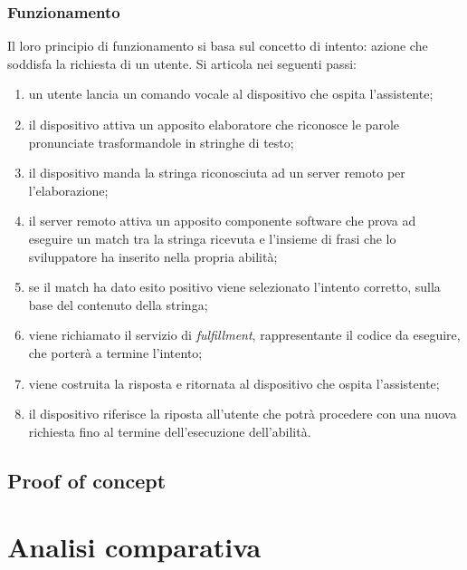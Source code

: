 		\subsubsection{Funzionamento}
		Il loro principio di funzionamento si basa sul concetto di intento: azione che soddisfa la richiesta di un utente. Si articola nei seguenti passi:
		\begin{enumerate}
			\item un utente lancia un comando vocale al dispositivo che ospita l'assistente;
			\item il dispositivo attiva un apposito elaboratore che riconosce le parole pronunciate trasformandole in stringhe di testo;
			\item il dispositivo manda la stringa riconosciuta ad un server remoto per l'elaborazione;
			\item il server remoto attiva un apposito componente software che prova ad eseguire un match tra la stringa ricevuta e l'insieme di frasi che lo sviluppatore ha inserito nella propria abilità;
			\item se il match ha dato esito positivo viene selezionato l'intento corretto, sulla base del contenuto della stringa;
			\item viene richiamato il servizio di \textit{fulfillment}, rappresentante il codice da eseguire, che porterà a termine l'intento;
			\item viene costruita la risposta e ritornata al dispositivo che ospita l'assistente;
			\item il dispositivo riferisce la riposta all'utente che potrà procedere con una nuova richiesta fino al termine dell'esecuzione dell'abilità.
		\end{enumerate}
	\subsection{Proof of concept}

\section{Analisi comparativa}